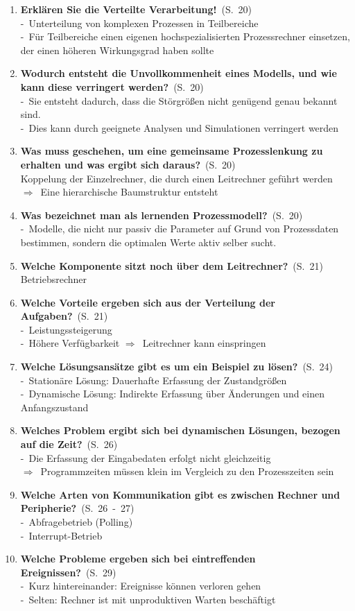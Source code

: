\documentclass[a4paper,12pt]{article}
\newcommand{\question}[3]{\pagebreak[3]\item {\textbf{#1?}}\ (S.\ #2)#3}
\newcommand{\statement}[3]{\pagebreak[3]\item {\textbf{#1!}}\ (S.\ #2)#3}
\newcommand{\catchword}[1]{\\-\ #1}
\newcommand{\normaltext}[1]{\\#1}
\newcommand{\result}[1]{\\$\Rightarrow$\ #1}
\newcommand{\resultol}[1]{$\Rightarrow$\ #1}
\newcommand{\page}[1]{#1}
\newcommand{\pages}[2]{#1\ -\ #2}
\begin{document}
\begin{enumerate}
  \statement{Erklären Sie die Verteilte Verarbeitung}{\page{20}}
  {
    \catchword{Unterteilung von komplexen Prozessen in Teilbereiche}
    \catchword{Für Teilbereiche einen eigenen hochspezialisierten Prozessrechner einsetzen,
               der einen höheren Wirkungsgrad haben sollte}
  }

  \question{Wodurch entsteht die Unvollkommenheit eines Modells, und wie kann diese 
            verringert werden}{\page{20}}
  {
    \catchword{Sie entsteht dadurch, dass die Störgrößen nicht genügend genau bekannt sind.}
    \catchword{Dies kann durch geeignete Analysen und Simulationen verringert werden}
  }

  \question{Was muss geschehen, um eine gemeinsame Prozesslenkung zu erhalten und
            was ergibt sich daraus}{\page{20}}
  {
    \normaltext{Koppelung der Einzelrechner, die durch einen Leitrechner geführt werden}
    \result{Eine hierarchische Baumstruktur entsteht}
  }

  \question{Was bezeichnet man als lernenden Prozessmodell}{\page{20}}
  {
    \catchword{Modelle, die nicht nur passiv die Parameter auf Grund von Prozessdaten bestimmen,
               sondern die optimalen Werte aktiv selber sucht.}
  }

  \question{Welche Komponente sitzt noch über dem Leitrechner}{\page{21}}
  {
    \normaltext{Betriebsrechner}
  }

  \question{Welche Vorteile ergeben sich aus der Verteilung der Aufgaben}{\page{21}}
  {
    \catchword{Leistungssteigerung}
    \catchword{Höhere Verfügbarkeit \resultol{Leitrechner kann einspringen}}
  }

  \question{Welche Lösungsansätze gibt es um ein Beispiel zu lösen}{\page{24}}
  {
    \catchword{Stationäre Lösung: Dauerhafte Erfassung der Zustandgrößen}
    \catchword{Dynamische Lösung: Indirekte Erfassung über Änderungen und einen Anfangszustand}
  }

  \question{Welches Problem ergibt sich bei dynamischen Lösungen, bezogen auf die Zeit}{\page{26}}
  {
    \catchword{Die Erfassung der Eingabedaten erfolgt nicht gleichzeitig}
    \result{Programmzeiten müssen klein im Vergleich zu den Prozesszeiten sein}
  }

  \question{Welche Arten von Kommunikation gibt es zwischen Rechner und Peripherie}{\pages{26}{27}}
  {
    \catchword{Abfragebetrieb (Polling)}
    \catchword{Interrupt-Betrieb}
  }

  \question{Welche Probleme ergeben sich bei eintreffenden Ereignissen}{\page{29}}
  {
    \catchword{Kurz hintereinander: Ereignisse können verloren gehen}
    \catchword{Selten: Rechner ist mit unproduktiven Warten beschäftigt}
  }


\end{enumerate}
\end{document}
